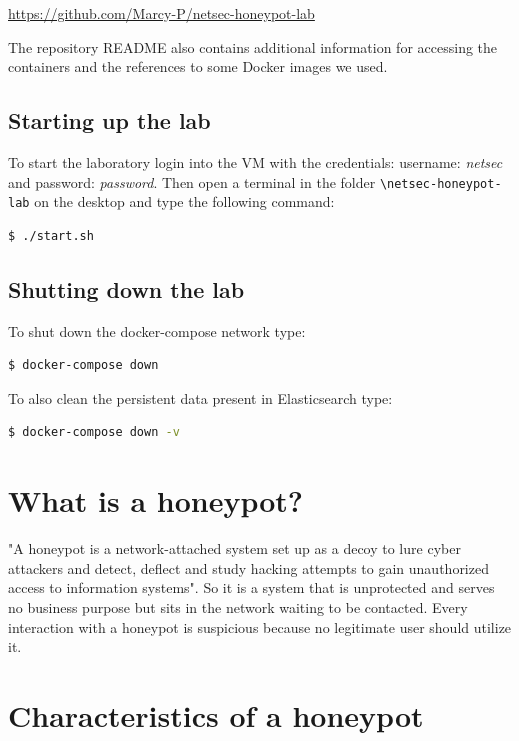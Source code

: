 \documentclass[epsfig,a4paper,11pt,titlepage,oneside,openany]{book}
\begin{document}
\url{https://github.com/Marcy-P/netsec-honeypot-lab}

\noindent The repository README also contains additional information for accessing the containers and the references to some Docker images we used.

\section*{Starting up the lab}
To start the laboratory login into the VM with the credentials: username: \textit{netsec} and password: \textit{password}. Then open a terminal in the folder \texttt{\textbackslash netsec-honeypot-lab} on the desktop and type the following command:

\begin{lstlisting}[language=bash]
$ ./start.sh
\end{lstlisting}

\section*{Shutting down the lab}
To shut down the docker-compose network type:

\begin{lstlisting}[language=bash]
$ docker-compose down
\end{lstlisting}

\noindent To also clean the persistent data present in Elasticsearch type:

\begin{lstlisting}[language=bash]
$ docker-compose down -v
\end{lstlisting}

\newpage

\chapter{What is a honeypot?}
\label{cha:intro}

"A honeypot is a network-attached system set up as a decoy to lure cyber attackers and detect, deflect and study hacking attempts to gain unauthorized access to information systems"\cite{techtarget}. So it is a system that is unprotected and serves no business purpose but sits in the network waiting to be contacted. Every interaction with a honeypot is suspicious because no legitimate user should utilize it.

\chapter{Characteristics of a honeypot}
\label{cha:characteristics}
\end{document}

